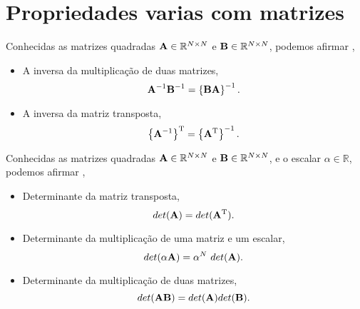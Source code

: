 \section{Propriedades varias com matrizes}


\begin{theorem}\label{theo:matrixgeneric2}
Conhecidas as matrizes quadradas $\MATRIX{A} \in \mathbb{R}^{N \times N}$ e $\MATRIX{B} \in \mathbb{R}^{N \times N}$,
podemos afirmar \cite[pp. 65]{golub2013matrix},
\begin{itemize}
\item  A inversa da multiplicação de duas matrizes,
\begin{equation}
\MATRIX{A}^{-1} \MATRIX{B}^{-1} = \left\{\MATRIX{B}\MATRIX{A}\right\}^{-1}.
\end{equation}
\item A inversa da matriz transposta,
\begin{equation}
\left\{\MATRIX{A}^{-1}\right\}^{\transpose}  = \left\{\MATRIX{A}^{\transpose}\right\}^{-1}.
\end{equation}
\end{itemize}
\end{theorem}

\begin{theorem}\label{theo:matrixgeneric1}
Conhecidas as matrizes quadradas $\MATRIX{A} \in \mathbb{R}^{N \times N}$ e $\MATRIX{B} \in \mathbb{R}^{N \times N}$,
e o escalar $\alpha \in \mathbb{R}$, podemos afirmar \cite[pp. 66]{golub2013matrix},
\begin{itemize}
\item Determinante da matriz transposta,
\begin{equation}
det(\MATRIX{A})=det(\MATRIX{A}^{\transpose}).
\end{equation}
\item Determinante da multiplicação de uma matriz e um escalar,
\begin{equation}
det(\alpha \MATRIX{A})=\alpha^N~det(\MATRIX{A}).
\end{equation}
\item Determinante da multiplicação de duas matrizes,
\begin{equation}
det(\MATRIX{A}\MATRIX{B})=det(\MATRIX{A})det(\MATRIX{B}).
\end{equation}
\end{itemize}
\end{theorem}


